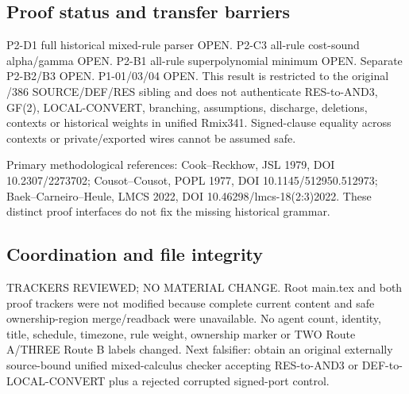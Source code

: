 \documentclass[11pt]{article}
\begin{document}
\subsection*{Proof status and transfer barriers}
P2-D1 full historical mixed-rule parser OPEN. P2-C3 all-rule cost-sound alpha/gamma OPEN. P2-B1 all-rule superpolynomial minimum OPEN. Separate P2-B2/B3 OPEN. P1-01/03/04 OPEN. This result is restricted to the original /386 SOURCE/DEF/RES sibling and does not authenticate RES-to-AND3, GF(2), LOCAL-CONVERT, branching, assumptions, discharge, deletions, contexts or historical weights in unified Rmix341. Signed-clause equality across contexts or private/exported wires cannot be assumed safe.

\noindent Primary methodological references: Cook--Reckhow, JSL 1979, DOI 10.2307/2273702; Cousot--Cousot, POPL 1977, DOI 10.1145/512950.512973; Baek--Carneiro--Heule, LMCS 2022, DOI 10.46298/lmcs-18(2:3)2022. These distinct proof interfaces do not fix the missing historical grammar.

\subsection*{Coordination and file integrity}
TRACKERS REVIEWED; NO MATERIAL CHANGE. Root main.tex and both proof trackers were not modified because complete current content and safe ownership-region merge/readback were unavailable. No agent count, identity, title, schedule, timezone, rule weight, ownership marker or TWO Route A/THREE Route B labels changed. Next falsifier: obtain an original externally source-bound unified mixed-calculus checker accepting RES-to-AND3 or DEF-to-LOCAL-CONVERT plus a rejected corrupted signed-port control.
\end{document}
